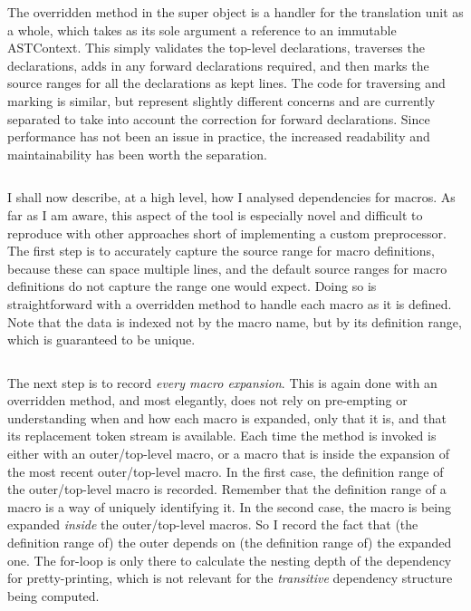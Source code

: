 \inputminted[breaklines,fontsize=\footnotesize,lastline=35]{cpp}{code/reachability_analyzer.cpp}

The overridden method in the super object is a handler for the translation unit
as a whole, which takes as its sole argument a reference to an immutable
ASTContext. This simply validates the top-level declarations, traverses the
declarations, adds in any forward declarations required, and then marks the
source ranges for all the declarations as kept lines. The code for traversing
and marking is similar, but represent slightly different concerns and are
currently separated to take into account the correction for forward
declarations. Since performance has not been an issue in practice, the
increased readability and maintainability has been worth the separation.

\inputminted[breaklines,fontsize=\footnotesize,firstline=37]{cpp}{code/reachability_analyzer.cpp}

I shall now describe, at a high level, how I analysed dependencies for macros.
As far as I am aware, this aspect of the tool is especially novel and difficult
to reproduce with other approaches short of implementing a custom preprocessor.
The first step is to accurately capture the source range for macro definitions,
because these can space multiple lines, and the default source ranges for macro
definitions do not capture the range one would expect. Doing so is straightforward with a overridden method to handle each macro
as it is defined. Note that the data is indexed not by the macro name, but by
its definition range, which is guaranteed to be unique.

\inputminted[breaklines,fontsize=\footnotesize,lastline=19]{cpp}{code/reachability_analyzer.hpp}

The next step is to record \emph{every macro expansion}. This is again done
with an overridden method, and most elegantly, does not rely on pre-empting or
understanding when and how each macro is expanded, only that it is, and that
its replacement token stream is available. Each time the method is invoked is
either with an outer/top-level macro, or a macro that is inside the expansion
of the most recent outer/top-level macro. In the first case, the definition
range of the outer/top-level macro is recorded. Remember that the definition
range of a macro is a way of uniquely identifying it. In the second case, the
macro is being expanded \emph{inside} the outer/top-level macros. So I record
the fact that (the definition range of) the outer depends on (the definition
range of) the expanded one. The for-loop is only there to calculate
the nesting depth of the dependency for pretty-printing, which is not relevant
for the \emph{transitive} dependency structure being computed.

